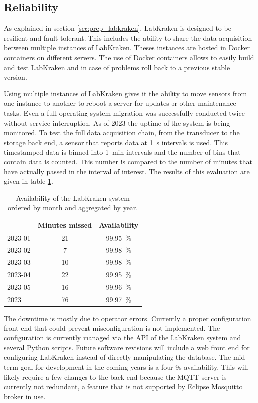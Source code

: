 \subsection{Reliability}
As explained in section \ref{sec:prep_labkraken}, LabKraken is designed to be resilient and fault tolerant. This includes the ability to share the data acquisition between multiple instances of LabKraken. Theses instances are hosted in Docker containers on different servers. The use of Docker containers allows to easily build and test LabKraken and in case of problems roll back to a previous stable version.

Using multiple instances of LabKraken gives it the ability to move sensors from one instance to another to reboot a server for updates or other maintenance tasks. Even a full operating system migration was successfully conducted twice without service interruption. As of 2023 the uptime of the system is being monitored. To test the full data acquisition chain, from the transducer to the storage back end, a sensor that reports data at \qty{1}{\second} intervals is used. This timestamped data is binned into \qty{1}{\minute} intervals and the number of bins that contain data is counted. This number is compared to the number of minutes that have actually passed in the interval of interest. The results of this evaluation are given in table \ref{tab:kraken_availability}.
\begin{table}[hb]
    \centering
    \begin{tabular}{lcc}
        \toprule
        & Minutes missed& Availability\\
        \midrule
        2023-01& 21& \qty{99.95}{\percent}\\
        2023-02& 7& \qty{99.98}{\percent}\\
        2023-03& 10& \qty{99.98}{\percent}\\
        2023-04& 22& \qty{99.95}{\percent}\\
        2023-05& 16& \qty{99.96}{\percent}\\
        2023 & 76& \qty{99.97}{\percent}\\
        \bottomrule
    \end{tabular}
    \caption{Availability of the LabKraken system ordered by month and aggregated by year.}
    \label{tab:kraken_availability}
\end{table}

The downtime is mostly due to operator errors. Currently a proper configuration front end that could prevent misconfiguration is not implemented. The configuration is currently managed via the API of the LabKraken system and several Python scripts. Future software revisions will include a web front end for configuring LabKraken instead of directly manipulating the database. The mid-term goal for development in the coming years is a four 9s availability. This will likely require a few changes to the back end because the MQTT server is currently not redundant, a feature that is not supported by Eclipse Mosquitto broker in use.

